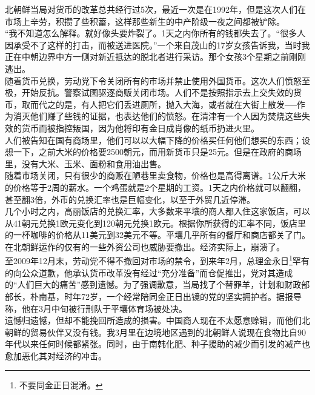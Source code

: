 北朝鲜当局对货币的改革总共经行过5次，最近一次是在1992年，但是这次人们在市场上辛劳，积攒了些积蓄，这样那些新生的中产阶级一夜之间都被铲除。\\

“我不知道怎么解释。就好像头要炸裂了。1天之内你所有的钱都失去了。“很多人因承受不了这样的打击，而被送进医院。”一个来自茂山的17岁女孩告诉我，当时我正在中朝边界中方一侧对新近抵达的脱北者进行采访。那个女孩3个星期之前刚刚逃出。\\

随着货币兑换，劳动党下令关闭所有的市场并禁止使用外国货币。这次人们愤怒至极，开始反抗。警察试图驱逐商贩关闭市场。人们不是按照指示去上交失效的货币，取而代之的是，有人把它们丢进厕所，抛入大海，或者就在大街上散发──作为消灭他们赚了些钱的证据，也表达他们的愤怒。在清津有一个人因为焚烧这些失效的货币而被指控叛国，因为他将印有金日成肖像的纸币扔进火里。\\

人们被告知在国有商场里，他们可以以大幅下降的价格买任何他们想买的东西；设想一下，之前大米的价格要2500朝元，而用新货币只是25元。但是在政府的商场里，没有大米、玉米、面粉和食用油出售。\\

随着市场关闭，只有很少的商贩在陋巷里卖食物，价格也是高得离谱。1公斤大米的价格等于2周的薪水。一个鸡蛋就是2个星期的工资。1天之内价格就可以翻翻，甚至翻3倍，外币的兑换汇率也是巨幅变化，以至于外贸几近停滞。\\

几个小时之内，高丽饭店的兑换汇率，大多数来平壤的商人都入住这家饭店，可以从41朝元兑换1欧元变化到120朝元兑换1欧元。根据你所获得的汇率不同，饭店里的一杯咖啡的价格从11美元到32美元不等。平壤几乎所有的餐厅和商店都关了门。在北朝鲜运作的仅有的一些外资公司也威胁要撤出。经济实际上，崩溃了。\\

至2009年12月末，劳动党不得不撤回对市场的禁令，到来年2月，总理金永日\footnote{不要同金正日混淆。}罕有的向公众道歉，他承认货币改革没有经过“充分准备”而仓促推出，党对其造成的“人们巨大的痛苦”感到遗憾。为了强调歉意，当局找了个替罪羊，计划和财政部部长，朴南基，时年72岁，一个经常陪同金正日出镜的党的坚实拥护者。据报导称，他在3月中旬被行刑队于平壤体育场被处决。\\

遗憾归遗憾，但却不能挽回所造成的损害。中国商人现在不太愿意赊销，而他们北朝鲜的贸易伙伴又没有钱。我3月里在边境地区遇到的北朝鲜人说现在食物比自90年代以来任何时候都紧张。同时，由于南韩化肥、种子援助的减少而引发的减产也愈加恶化其对经济的冲击。\\

